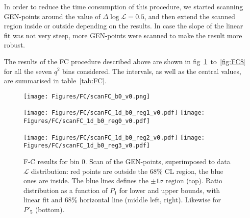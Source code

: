 In order to reduce the time consumption of this procedure, we started scanning GEN-points around the value of $\Delta\log\mathcal{L}=0.5$, and then extend the scanned region inside or outside depending on the results.
In case the slope of the linear fit was not very steep, more GEN-points were scanned to make the result more robust.


The results of the FC procedure described above are shown in fig~\ref{fig:FC0}~to~\ref{fig:FC8} for all the seven $q^2$ bins considered.
The intervals, as well as the central values, are summarised in table~\ref{tab:FC}.

\begin{figure}
  \centering
  \texttt{[image: Figures/FC/scanFC\_b0\_v0.png]}

  \texttt{[image: Figures/FC/scanFC\_1d\_b0\_reg1\_v0.pdf]}
  \texttt{[image: Figures/FC/scanFC\_1d\_b0\_reg0\_v0.pdf]}

  \texttt{[image: Figures/FC/scanFC\_1d\_b0\_reg2\_v0.pdf]}
  \texttt{[image: Figures/FC/scanFC\_1d\_b0\_reg3\_v0.pdf]}

  \caption{F-C results for bin 0.
    Scan of the GEN-points, superimposed to data $\mathcal{L}$ distribution: red points are outside the 68\% CL region, the blue ones are inside.
    The blue lines defines the $\pm1\sigma$ region (top).
    Ratio distribution as a function of $P_1$ for lower and upper bounds, with linear fit and 68\% horizontal line (middle left, right).
    Likewise for $P'_5$ (bottom).}
  \label{fig:FC0}
\end{figure}

